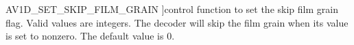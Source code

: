 \begin{Desc}
\begin{description}
{A\+V1\+D\+\_\+\+S\+E\+T\+\_\+\+S\+K\+I\+P\+\_\+\+F\+I\+L\+M\+\_\+\+G\+R\+A\+IN\hypertarget{group__aom__decoder_gga3865fd4b3192489baa9a5c3632ebe97ba17fa09c9ce1ae4a68eae21efd219418b}{}\label{group__aom__decoder_gga3865fd4b3192489baa9a5c3632ebe97ba17fa09c9ce1ae4a68eae21efd219418b}
}]control function to set the skip film grain flag. Valid values are integers. The decoder will skip the film grain when its value is set to nonzero. The default value is 0. \end{description}
\end{Desc}
